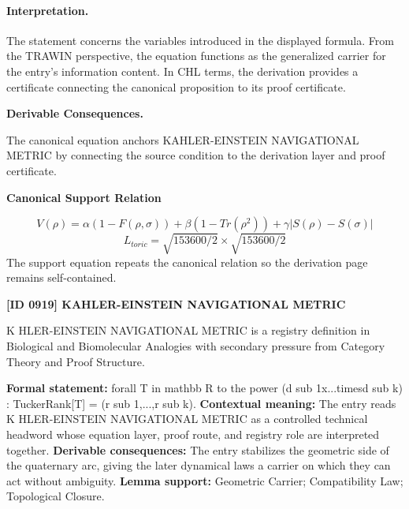 \paragraph{Interpretation.}
The statement concerns the variables introduced in the displayed formula. From the TRAWIN perspective, the equation functions as the generalized carrier for the entry’s information content. In CHL terms, the derivation provides a certificate connecting the canonical proposition to its proof certificate.

\par\vspace{0.35em}
\noindent\textbf{Derivable Consequences.}\quad
\begingroup
\footnotesize
\raggedright
The canonical equation anchors KAHLER-EINSTEIN NAVIGATIONAL METRIC by connecting the source condition to the derivation layer and proof certificate.
\par\endgroup

\noindent\textbf{Canonical Support Relation}\par
\[
V(\rho) = \alpha(1 - F(\rho, \sigma)) + \beta(1 - Tr(\rho^2)) + \gamma|S(\rho) - S(\sigma)|
\]
\[
L_{toric} = \sqrt{153600/2} \times \sqrt{153600/2}
\]
\noindent The support equation repeats the canonical relation so the derivation page remains self-contained.\par

\clearpage
\noindent\textbf{[ID 0919] KAHLER-EINSTEIN NAVIGATIONAL METRIC}\par
\vspace{0.35em}
\begingroup\small
{}
K HLER-EINSTEIN NAVIGATIONAL METRIC is a registry definition in Biological and Biomolecular Analogies with secondary pressure from Category Theory and Proof Structure.

\begingroup\footnotesize\setlength{\emergencystretch}{3em}\sloppy
\textbf{Formal statement:} forall T in mathbb R to the power (d sub 1x...timesd sub k) : TuckerRank[T] = (r sub 1,...,r sub k). \textbf{Contextual meaning:} The entry reads K HLER-EINSTEIN NAVIGATIONAL METRIC as a controlled technical headword whose equation layer, proof route, and registry role are interpreted together. \textbf{Derivable consequences:} The entry stabilizes the geometric side of the quaternary arc, giving the later dynamical laws a carrier on which they can act without ambiguity. \textbf{Lemma support:} Geometric Carrier; Compatibility Law; Topological Closure.\par
\endgroup

